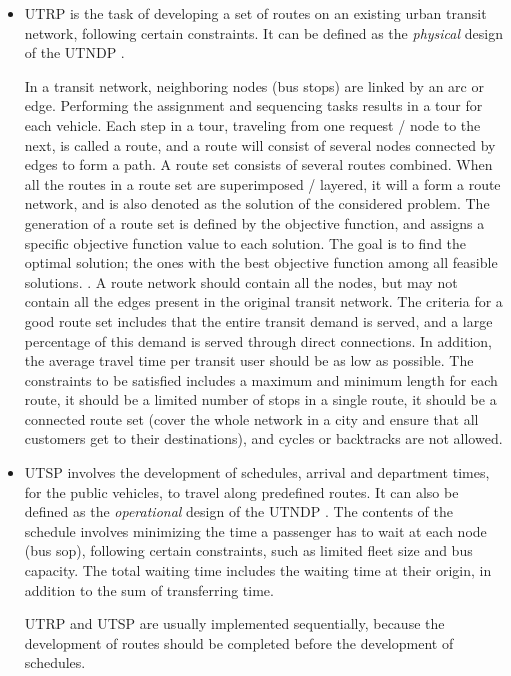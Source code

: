 \begin{itemize}
\item UTRP is the task of developing a set of routes on an existing urban transit network, following certain constraints. It can be defined as the \textit{physical} design of the UTNDP \citep{fan09}. 

In a transit network, neighboring nodes (bus stops) are linked by an arc or edge. Performing the assignment and sequencing tasks results in a tour for each vehicle. Each step in a tour, traveling from one request / node to the next, is called a route, and a route will consist of several nodes connected by edges to form a path. A route set consists of several routes combined. When all the routes in a route set are superimposed / layered, it will a form a route network, and is also denoted as the solution of the considered problem. The generation of a route set is defined by the objective function, and assigns a specific objective function value to each solution. The goal is to find the optimal solution; the ones with the best objective function among all feasible solutions. \citep{vehiclerouting}. A route network should contain all the nodes, but may not contain all the edges present in the original transit network. The criteria for a good route set includes that the entire transit demand is served, and a large percentage of this demand is served through direct connections. In addition, the average travel time per transit user should be as low as possible. The constraints to be satisfied includes a maximum and minimum length for each route, it should be a limited number of stops in a single route, it should be a connected route set  (cover the whole network in a city and ensure that all customers get to their destinations), and cycles or backtracks are not allowed\citep{fan09}.

\item UTSP involves the development of schedules, arrival and department times, for the public vehicles, to travel along predefined routes. It can also be defined as the \textit{operational} design of the UTNDP \citep{fan09}. 
The contents of the schedule involves minimizing the time a passenger has to wait at each node (bus sop), following certain constraints, such as limited fleet size and bus capacity.  The total waiting time includes the waiting time at their origin, in addition to the sum of transferring time.

UTRP and UTSP are usually implemented sequentially, because the development of routes should be completed before the development of schedules. 
\end{itemize}

